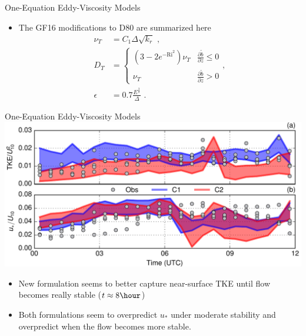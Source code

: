 \begin{frame}{One-Equation Eddy-Viscosity Models}
\begin{itemize}
	\item The GF16 modifications to D80 are summarized here
	\begin{align*}
\nu_T &=C_1 \Delta \sqrt{k_r} \mbox{ ,} \\
D_T &= 
\begin{cases}
\left(3 - 2e^{-\mathrm{Ri}^2}\right)\nu_T & \frac{\partial \tilde{b}}{\partial z} \leq 0\\
\nu_T  & \frac{\partial \tilde{b}}{\partial z} > 0
\end{cases},\\
\epsilon &= 0.7 \frac{E^{\frac{3}{2}}}{\Delta} \mbox{ .}
\end{align*}
\end{itemize}

\end{frame}


\begin{frame}{One-Equation Eddy-Viscosity Models}
\includegraphics[width=\textwidth]{Gibbs_Fig7.pdf}
\begin{itemize}
	\item New formulation seems to better capture near-surface TKE until flow becomes really stable ($t\approx8\hour$)
	\item Both formulations seem to overpredict $u_*$ under moderate stability and overpredict when the flow becomes more stable. 
\end{itemize}

\end{frame}


